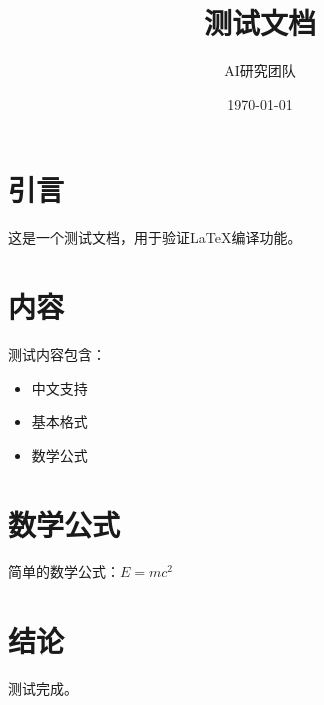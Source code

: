 \documentclass[12pt]{article}
\title{测试文档}
\author{AI研究团队}
\date{\today}
\begin{document}
\maketitle

\section{引言}
这是一个测试文档，用于验证LaTeX编译功能。

\section{内容}
测试内容包含：
\begin{itemize}
    \item 中文支持
    \item 基本格式
    \item 数学公式
\end{itemize}

\section{数学公式}
简单的数学公式：$E = mc^2$

\section{结论}
测试完成。
\end{document}
